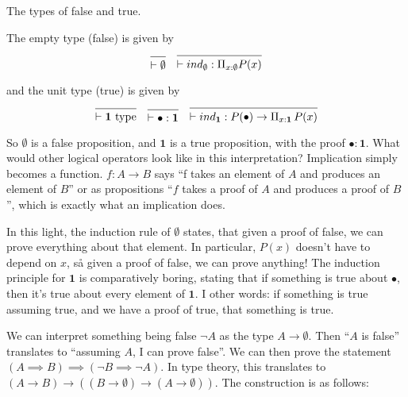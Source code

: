 \documentclass[a4paper, 12pt]{article}
\newcommand{\type}{\text{ type}}
\theoremstyle{changedot}
\theoremstyle{changedotbreak}
\theoremstyle{nonumberplain}
\begin{document}
\begin{definition}
  The types of false and true.

  The empty type (false) is given by
\begin{align*}
  \begin{prooftree}
    \infer0{\vdash \emptyset}
  \end{prooftree} & &
  \begin{prooftree}
    \infer0{\vdash ind_{\emptyset} : \Pi_{x:\emptyset} P(x)}
  \end{prooftree}
\end{align*}

and the unit type (true) is given by
\begin{align*}
  \begin{prooftree}
    \infer0{\vdash \mathbf{1} \type}
  \end{prooftree} & &
                    \begin{prooftree}
                      \infer0{\vdash \bullet : \mathbf 1}
                      \end{prooftree}& &
                      \begin{prooftree}
                        \infer0{\vdash ind_{\mathbf 1} : P(\bullet) \to \Pi_{x : \mathbf 1}\, P(x)}
                      \end{prooftree}
  \end{align*}

\end{definition}

So $\emptyset$ is a false proposition, and $\mathbf 1$ is a true proposition, with the proof $\bullet : \mathbf 1$. What would other logical operators look like in this interpretation? Implication simply becomes a function. $f : A \to B$ says ``f takes an element of $A$ and produces an element of $B$'' or as propositions ``$f$ takes a proof of $A$ and produces a proof of $B$'', which is exactly what an implication does.

In this light, the induction rule of $\emptyset$ states, that given a proof of false, we can prove everything about that element. In particular, $P(x)$ doesn't have to depend on $x$, så given a proof of false, we can prove anything! The induction principle for $\mathbf 1$ is comparatively boring, stating that if something is true about $\bullet$, then it's true about every element of $\mathbf 1$. I other words: if something is true assuming true, and we have a proof of true, that something is true.

We can interpret something being false $\neg A$ as the type $A \to \emptyset$. Then ``$A$ is false'' translates to ``assuming $A$, I can prove false''. We can then prove the statement $(A \implies B) \implies (\neg B \implies \neg A)$. In type theory, this translates to $(A \to B) \to ((B \to \emptyset) \to (A \to \emptyset))$. The construction is as follows:
\end{document}
